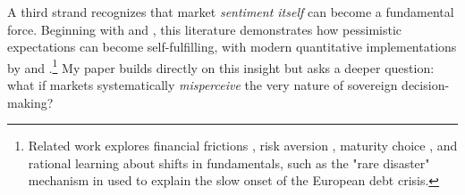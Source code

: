 \documentclass[12pt]{article}
\theoremstyle{plain}
\begin{document}
A third strand recognizes that market \textit{sentiment itself} can become a
fundamental force. Beginning with \citep{CalvoLeidermanReinhart1996} and
\citep{ColeKehoe2000}, this literature demonstrates how pessimistic
expectations can become self-fulfilling, with modern quantitative
implementations by \citep{GennaioliMartinRossi2014} and
\citep{BocolaDovis2019}.\footnote{Related work explores financial frictions
	\citep{LongstaffPanPedersenSingleton2011}, risk aversion \citep{Lizarazo2013},
	maturity choice \citep{Stangebye2020}, and rational learning about shifts in
	fundamentals, such as the "rare disaster" mechanism in \citep{Paluszynski2023}
	used to explain the slow onset of the European debt crisis.} My paper builds
directly on this insight but asks a deeper question: what if markets
systematically \emph{misperceive} the very nature of sovereign decision-making?
\end{document}
